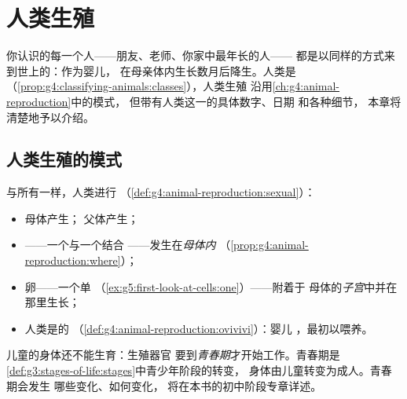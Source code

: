 \chapter{人类生殖}\label{ch:g5:human-reproduction}

你认识的每一个人——朋友、老师、你家中最年长的人——
都是以同样的方式来到世上的：作为婴儿，
在母亲体内生长数月后降生。人类是
（\cref{prop:g4:classifying-animals:classes}），人类生殖
沿用\cref{ch:g4:animal-reproduction}中的模式，
但带有人类这一的具体数字、日期
和各种细节，
本章将清楚地予以介绍。

\section{人类生殖的模式}

\begin{proposition}[人类生殖就是哺乳动物的生殖]\label{prop:g5:human-reproduction:plan}
与所有一样，人类进行
（\cref{def:g4:animal-reproduction:sexual}）：
\begin{itemize}
  \item 母体产生\emph{}；
        父体产生\emph{}；
  \item {}——一个与一个结合
        ——发生在\emph{母体内}
        （\cref{prop:g4:animal-reproduction:where}）；
  \item {}卵——一个单
        （\cref{ex:g5:first-look-at-cells:one}）——附着于
        母体的\emph{子宫}中并在那里生长；
  \item 人类是的
        （\cref{def:g4:animal-reproduction:ovivivi}）：婴儿
        ，最初以喂养。
\end{itemize}
\end{proposition}
\admitted

\begin{remark}[生殖需要成年人的身体]\label{rem:g5:human-reproduction:adults}
儿童的身体还不能生育：生殖器官
要到\emph{青春期}才开始工作。青春期是
\cref{def:g3:stages-of-life:stages}中青少年阶段的转变，
身体由儿童转变为成人。青春期会发生
哪些变化、如何变化，
将在本书的初中阶段专章详述。
\end{remark}


